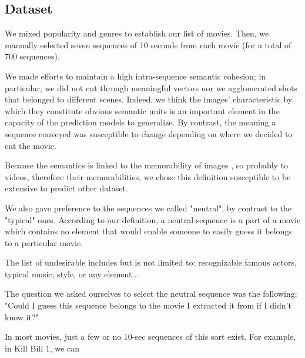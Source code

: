 \documentclass[sigconf]{acmart}
\begin{document}
\subsection{Dataset}
We mixed popularity and genres to establish our list of movies.%
Then, we manually selected seven sequences of 10 seconds from each movie (for a total of 700 sequences). %

We made efforts to maintain a high intra-sequence semantic cohesion; in particular, we did not cut through meaningful vectors nor we agglomerated shots that belonged to different scenes.
Indeed, we think the images' characteristic by which they constitute obvious semantic units is an important element in the capacity of the prediction models to generalize.
By contrast, the meaning a sequence conveyed was susceptible to change depending on where we decided to cut the movie.


Because the semantics is linked to the memorability of images \cite{isola_2014_makes}, so probably to videos, therefore their memorabilities, we chose this definition susceptible to be extensive to predict other dataset.







We also gave preference to the sequences we called "neutral", by contrast to the "typical" ones.
According to our definition, a neutral sequence is a part of a movie which contains no element that would enable someone to easily guess it belongs to a particular movie.

The list of undesirable includes but is not limited to: recognizable famous actors, typical music, style, or any element... 

The question we asked ourselves to select the neutral sequence was the following: "Could I guess this sequence belongs to the movie I extracted it from if I didn't know it?"



In most movies, just a few or no 10-sec sequences of this sort exist. For example, in Kill Bill 1, we can 
\end{document}
